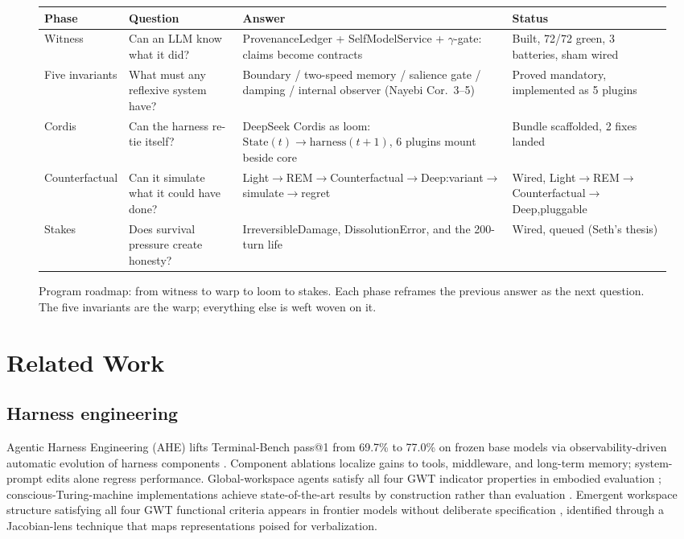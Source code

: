 \documentclass[11pt]{article}
\begin{document}
\begin{figure}[h]
\centering
\small
\begin{tabular}{P{2.6cm}P{4.0cm}P{4.2cm}P{2.2cm}}
\toprule
Phase & Question & Answer & Status \\
\midrule
Witness &
Can an LLM know what it did? &
ProvenanceLedger + SelfModelService + $\gamma$-gate: claims become contracts &
Built, 72/72 green, 3 batteries, sham wired \\
Five invariants &
What must any reflexive system have? &
Boundary / two-speed memory / salience gate / damping / internal observer (Nayebi Cor.~3--5) &
Proved mandatory, implemented as 5 plugins \\
Cordis &
Can the harness re-tie itself? &
DeepSeek Cordis as loom: $\mathrm{State}(t)\to\mathrm{harness}(t{+}1)$, 6 plugins mount beside core &
Bundle scaffolded, 2 fixes landed \\
Counterfactual &
Can it simulate what it could have done? &
Light$\to$\allowbreak{}REM$\to$\allowbreak{}Counter\-factual$\to$\allowbreak{}Deep:\linebreak[1] variant$\to$\allowbreak{}simulate$\to$\allowbreak{}regret &
Wired, Light$\to$\allowbreak{}REM$\to$\allowbreak{}Counter\-factual$\to$\allowbreak{}Deep,\linebreak[1] pluggable \\
Stakes &
Does survival pressure create honesty? &
Irreversible\-Damage, Dissolution\-Error, and the 200-turn life &
Wired, queued (Seth's thesis) \\
\bottomrule
\end{tabular}
\caption{Program roadmap: from witness to warp to loom to stakes. Each phase reframes the previous answer as the next question. The five invariants are the warp; everything else is weft woven on it.}
\label{fig:roadmap}
\end{figure}

\section{Related Work}\label{sec:related}

\subsection{Harness engineering}

Agentic Harness Engineering (AHE) lifts Terminal-Bench pass@1 from
69.7\% to 77.0\% on frozen base models via observability-driven automatic
evolution of harness components \citep{lin2026ahe}. Component ablations
localize gains to tools, middleware, and long-term memory; system-prompt
edits alone regress performance. Global-workspace agents satisfy all four
GWT indicator properties in embodied evaluation
\citep{baars1997,atallah2026gwt};
conscious-Turing-machine implementations achieve state-of-the-art results
by construction rather than evaluation \citep{yu2026ctmai}. Emergent
workspace structure satisfying all four GWT functional criteria appears in
frontier models without deliberate specification \citep{gurnee2026},
identified through a Jacobian-lens technique that maps representations
poised for verbalization.
\end{document}
